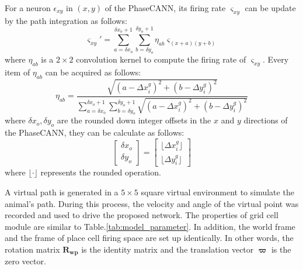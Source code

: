 \documentclass[final,5p,times,twocolumn]{elsarticle}
\begin{document}
For a neuron $\epsilon_{xy}$ in $(x,y)$ of the PhaseCANN, its firing rate $\varsigma_{xy}$ can be update by the path integration as follows:
\begin{equation}\label{rate_path_integration}
	\varsigma_{xy}' = \sum_{a=\delta x_o }^{\delta x_o +1}\sum_{b=\delta y_o}^{\delta y_o +1} \eta_{ab} \varsigma_{(x+a)(y+b)}
\end{equation}
where $\eta_{ab}$ is a $2\times2$ convolution kernel to compute the firing rate of $\varsigma_{xy}$. Every item of $\eta_{ab}$ can be acquired as follows:
\begin{equation}\label{convolution_kernel}
	\eta_{ab} = \frac{\sqrt{(a-\Delta x_i^g)^2+(b-\Delta y_i^g)^2}}{\sum_{a=\delta x_o }^{\delta x_o +1}\sum_{b=\delta y_o}^{\delta y_o +1}\sqrt{(a-\Delta x_i^g)^2+(b-\Delta y_i^g)^2}}
\end{equation}
where $\delta x_o,\delta y_o $ are the rounded down integer offsets in the $x$ and $y$ directions of the PhaseCANN, they can be calculate as follows:
\begin{equation}\label{rounded-offsets}
	\begin{bmatrix}
		\delta x_o\\
		\delta y_o
	\end{bmatrix}
	= 	
	\begin{bmatrix}
		\lfloor \Delta x_i^g \rfloor\\
		\lfloor \Delta y_i^g \rfloor
	\end{bmatrix}
\end{equation}
where $\lfloor \cdot \rfloor$ represents the rounded operation.

A virtual path is generated in a $5\times5$ square virtual environment to simulate the animal's path. During this process, the velocity and angle of the virtual point was recorded and used to drive the proposed network. The properties of grid cell module are similar to Table.\ref{tab:model_parameter}. In addition, the world frame and the frame of place cell firing space are set up identically. In other words, the rotation matrix $\bm{R_{wp}}$ is the identity matrix and the translation vector $\boldsymbol{\varpi}$ is the zero vector. 
\end{document}
